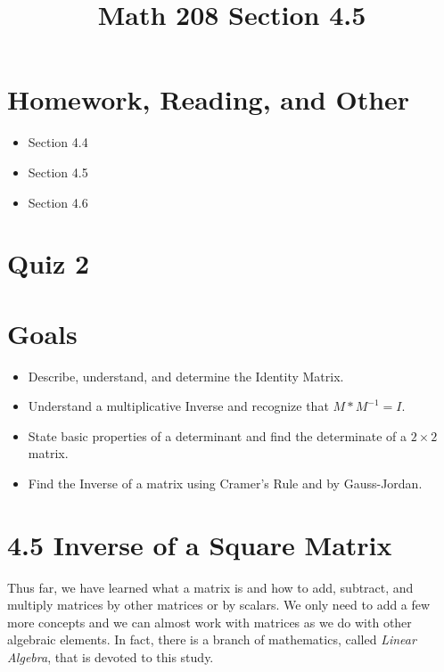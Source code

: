 \documentclass[14pt]{extarticle}
\title{\vspace{-5ex}Math 208 Section 4.5}
\date{\vspace{-10ex}}
\begin{document}
\maketitle		
\section*{Homework, Reading, and Other}
\begin{itemize}
	\item Section 4.4
	\item Section 4.5
	\item Section 4.6
\end{itemize}

\section*{Quiz 2}

\section*{Goals}
\begin{itemize}
	\item Describe, understand, and determine the Identity Matrix.
	\item Understand a multiplicative Inverse and recognize that $M*M^{-1} = I$.
	\item State basic properties of a determinant and find the determinate of a $2 \times 2$ matrix.
	\item Find the Inverse of a matrix using Cramer's Rule and by Gauss-Jordan.
\end{itemize}

\section*{4.5 Inverse of a Square Matrix}
Thus far, we have learned what a matrix is and how to add, subtract, and multiply matrices by other matrices or by scalars. We only need to add a few more concepts and we can almost work with matrices as we do with other algebraic elements. In fact, there is a branch of mathematics, called \textit{Linear Algebra}, that is devoted to this study.
\end{document}
